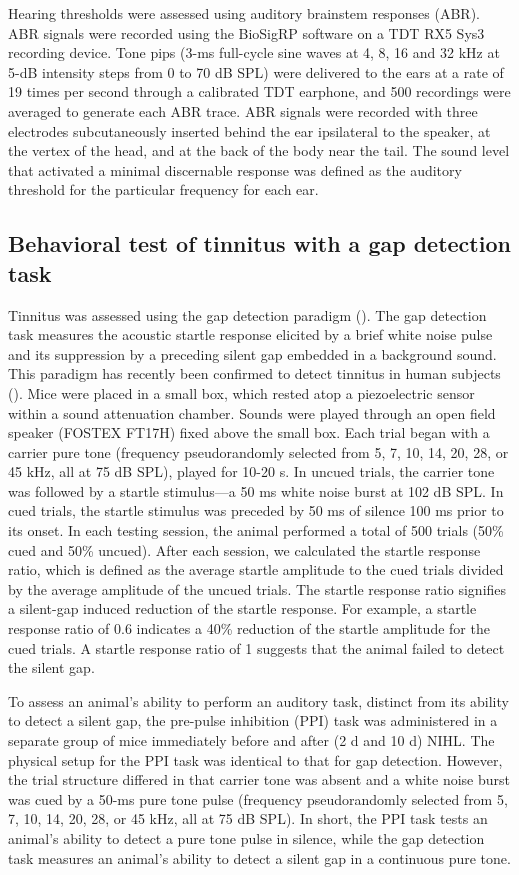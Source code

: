 Hearing thresholds were assessed using auditory brainstem responses (ABR). ABR signals were recorded using the BioSigRP software on a TDT RX5 Sys3 recording device. Tone pips (3-ms full-cycle sine waves at 4, 8, 16 and 32 kHz at 5-dB intensity steps from 0 to 70 dB SPL) were delivered to the ears at a rate of 19 times per second through a calibrated TDT earphone, and 500 recordings were averaged to generate each ABR trace. ABR signals were recorded with three electrodes subcutaneously inserted behind the ear ipsilateral to the speaker, at the vertex of the head, and at the back of the body near the tail. The sound level that activated a minimal discernable response was defined as the auditory threshold for the particular frequency for each ear.

\subsection{Behavioral test of tinnitus with a gap detection task}
Tinnitus was assessed using the gap detection paradigm (\cite{Turner2006}). The gap detection task measures the acoustic startle response elicited by a brief white noise pulse and its suppression by a preceding silent gap embedded in a background sound. This paradigm has recently been confirmed to detect tinnitus in human subjects (\cite{Fournier2013}). Mice were placed in a small box, which rested atop a piezoelectric sensor within a sound attenuation chamber. Sounds were played through an open field speaker (FOSTEX FT17H) fixed above the small box. Each trial began with a carrier pure tone (frequency pseudorandomly selected from 5, 7, 10, 14, 20, 28, or 45 kHz, all at 75 dB SPL), played for 10-20 s. In uncued trials, the carrier tone was followed by a startle stimulus---a 50 ms white noise burst at 102 dB SPL. In cued trials, the startle stimulus was preceded by 50 ms of silence 100 ms prior to its onset. In each testing session, the animal performed a total of 500 trials (50\% cued and 50\% uncued). After each session, we calculated the startle response ratio, which is defined as the average startle amplitude to the cued trials divided by the average amplitude of the uncued trials. The startle response ratio signifies a silent-gap induced reduction of the startle response. For example, a startle response ratio of 0.6 indicates a 40\% reduction of the startle amplitude for the cued trials. A startle response ratio of 1 suggests that the animal failed to detect the silent gap.

To assess an animal's ability to perform an auditory task, distinct from its ability to detect a silent gap, the pre-pulse inhibition (PPI) task was administered in a separate group of mice immediately before and after (2 d and 10 d) NIHL. The physical setup for the PPI task was identical to that for gap detection. However, the trial structure differed in that carrier tone was absent and a white noise burst was cued by a 50-ms pure tone pulse (frequency pseudorandomly selected from 5, 7, 10, 14, 20, 28, or 45 kHz, all at 75 dB SPL). In short, the PPI task tests an animal's ability to detect a pure tone pulse in silence, while the gap detection task measures an animal's ability to detect a silent gap in a continuous pure tone.

